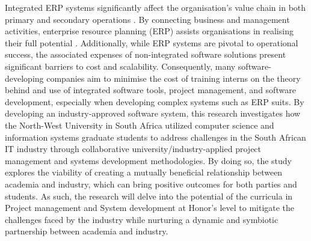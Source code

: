 \par{Integrated ERP systems significantly affect the organisation's value chain in both primary and secondary operations
 \citep{amini2020erp}. By connecting business and management
activities, enterprise resource planning (ERP) assists organisations in realising their full potential 
\citep{uccakturk2013effects}. Additionally, while ERP systems are pivotal to operational
success, the associated expenses of non-integrated software solutions present significant barriers
to cost and scalability. Consequently, many software-developing companies aim to minimise the
cost of training interns on the theory behind and use of integrated software tools, project management, 
and software development, especially when developing complex systems such as ERP suits. 
By developing an industry-approved software system, this research investigates how the North-West University in South Africa 
utilized computer science and information systems graduate students to address challenges in the South African IT 
industry through collaborative university/industry-applied project management and systems development methodologies. 
By doing so, the study explores the viability of creating a mutually beneficial
relationship between academia and industry, which can bring positive outcomes for both parties and students. 
As such, the research will delve into the potential of the curricula in Project management and System development at 
Honor's level to mitigate the challenges faced by the
industry while nurturing a dynamic and symbiotic partnership between academia and industry.}

